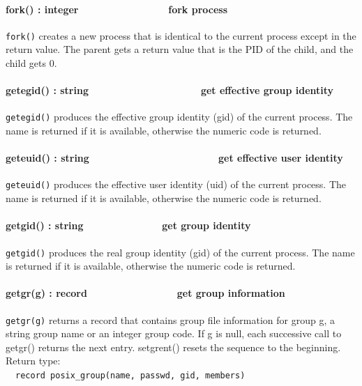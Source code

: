 \paragraph[fork() : integer\ \ \ \ \ \ \ \ \ \ \ \ \ \ \ \  fork
process]{fork() : integer\ \ \ \ \ \ \ \ \ \ \ \ \ \ \ \  fork process}
\texttt{fork()} creates a new process that is identical to the current process
except in the return value. The parent gets a return value that is the
PID of the child, and the child gets 0.

\paragraph[getegid() : string\ \ \ \ \ \ \ \ \ \ 
\ \ \ \ \ \ \ \ \ \ get effective group identity]{getegid() :
string\ \ \ \ \ \ \ \ \ \  \ \ \ \ \ \ \ \ \ \ get effective group
identity}
\texttt{getegid()} produces the effective group identity (gid) of the current
process. The name is returned if it is available, otherwise the numeric
code is returned.

\paragraph[geteuid() : string\ \ \ \ \ \ \ \ \ \ 
\ \ \ \ \ \ \ \ \ \ \ \ \ get effective user identity]{geteuid() :
string\ \ \ \ \ \ \ \ \ \  \ \ \ \ \ \ \ \ \ \ \ \ \ get effective user
identity}
\texttt{geteuid()} produces the effective user identity (uid) of the current
process. The name is returned if it is available, otherwise the numeric
code is returned.

\paragraph[getgid() : string\ \ \ \ \ \ \ \ \ \ \ \ \ \  get group
identity]{getgid() : string\ \ \ \ \ \ \ \ \ \ \ \ \ \  get group
identity}
\texttt{getgid()} produces the real group identity (gid) of the current process.
The name is returned if it is available, otherwise the numeric code is
returned.

\paragraph[getgr(g) : record\ \ \ \ \ \ \ \ \ \ \ \  \ \ \ \ get group
information]{getgr(g) : record\ \ \ \ \ \ \ \ \ \ \ \  \ \ \ \ get
group information}
\texttt{getgr(g)} returns a record that contains group file
information for group
g, a string group name or an integer group code. If g is null, each
successive call to getgr() returns the next entry. setgrent() resets
the sequence to the beginning. Return type:\\
\ \ \texttt{record posix\_group(name, passwd, gid, members)}

